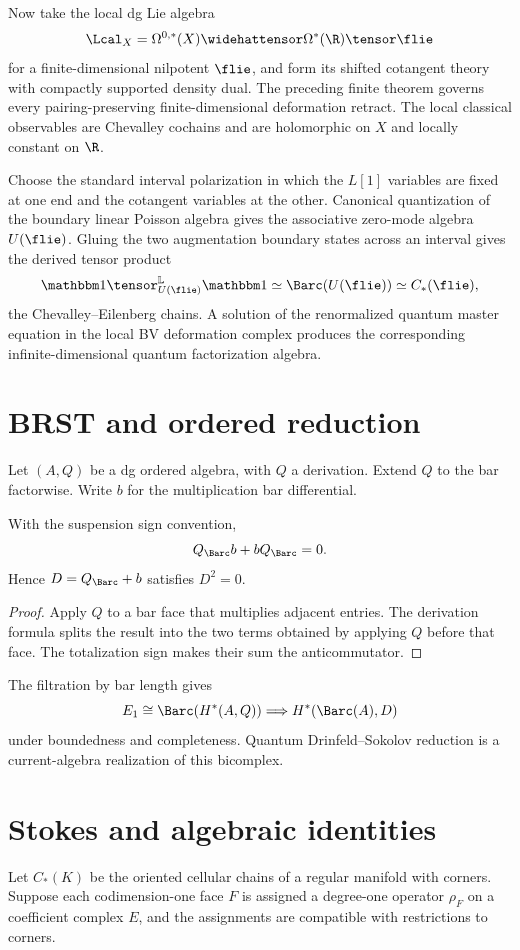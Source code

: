 Now take the local dg Lie algebra
\[
 \Lcal_X=\Omega^{0,*}(X)\widehattensor\Omega^*(\R)\tensor\flie
\]
for a finite-dimensional nilpotent $\flie$, and form its shifted cotangent theory with compactly supported density dual. The preceding finite theorem governs every pairing-preserving finite-dimensional deformation retract. The local classical observables are Chevalley cochains and are holomorphic on $X$ and locally constant on $\R$.

Choose the standard interval polarization in which the $L[1]$ variables are fixed at one end and the cotangent variables at the other. Canonical quantization of the boundary linear Poisson algebra gives the associative zero-mode algebra $U(\flie)$. Gluing the two augmentation boundary states across an interval gives the derived tensor product
\[
 \mathbbm1\tensor_{U(\flie)}^{\mathbb L}\mathbbm1
 \simeq\Barc(U(\flie))
 \simeq C_*(\flie),
\]
the Chevalley--Eilenberg chains. A solution of the renormalized quantum master equation in the local BV deformation complex produces the corresponding infinite-dimensional quantum factorization algebra.

\chapter{BRST and ordered reduction}
Let $(A,Q)$ be a dg ordered algebra, with $Q$ a derivation. Extend $Q$ to the bar factorwise. Write $b$ for the multiplication bar differential.

\begin{proposition}
With the suspension sign convention,
\[
 Q_{\Barc}b+bQ_{\Barc}=0.
\]
Hence $D=Q_{\Barc}+b$ satisfies $D^2=0$.
\end{proposition}
\begin{proof}
Apply $Q$ to a bar face that multiplies adjacent entries. The derivation formula splits the result into the two terms obtained by applying $Q$ before that face. The totalization sign makes their sum the anticommutator.
\end{proof}

The filtration by bar length gives
\[
 E_1\cong\Barc(H^*(A,Q))
 \Longrightarrow H^*(\Barc(A),D)
\]
under boundedness and completeness. Quantum Drinfeld--Sokolov reduction is a current-algebra realization of this bicomplex.

\chapter{Stokes and algebraic identities}
Let $C_*(K)$ be the oriented cellular chains of a regular manifold with corners. Suppose each codimension-one face $F$ is assigned a degree-one operator $\rho_F$ on a coefficient complex $E$, and the assignments are compatible with restrictions to corners.


